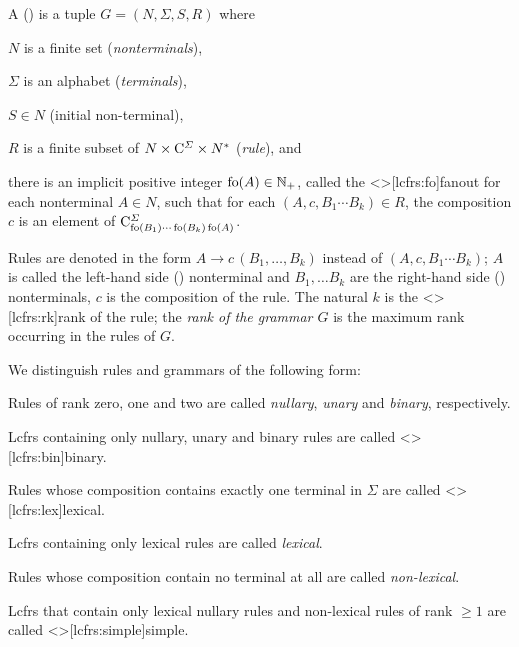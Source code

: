 \documentclass[../document.tex]{subfiles}
\begin{document}
    \begin{definition}
        A  ()%
        is a tuple \(G=(N, \varSigma, S, R)\) where
        \begin{compactenum}[(i)]
            \item \(N\) is a finite set (\emph{nonterminals}),
            \item \(\varSigma\) is an alphabet (\emph{terminals}),
            \item \(S \in N\) (initial non-terminal),
            \item \(R\) is a finite subset of \(N \times \mathrm{C}^\varSigma \times N^*\) (\emph{rule}), and
            \item there is an implicit positive integer \(\operatorname{fo}(A) \in \mathbb{N}_+\), called the <\lcfrs>[lcfrs:fo]{fanout} for each nonterminal \(A \in N\), such that
            for each \((A, c, B_1\cdots B_k) \in R\), the  composition \(c\) is an element of \(\mathrm{C}^\varSigma_{\operatorname{fo}(B_1) \cdots \operatorname{fo}(B_k) \operatorname{fo}(A)}\).
        \end{compactenum}

        Rules are denoted in the form \(A \to c\,(B_1, \ldots, B_k)\) instead of \((A, c, B_1 \cdots B_k)\); \(A\) is called the left-hand side () nonterminal and \(B_1, \ldots B_k\) are the right-hand side () nonterminals, \(c\) is the composition of the rule.
        The natural \(k\) is the <\lcfrs>[lcfrs:rk]{rank} of the rule; the \emph{rank of the grammar \(G\)} is the maximum rank occurring in the rules of \(G\).
    \end{definition}

    \begin{definition}
        We distinguish rules and grammars of the following form:
        \begin{compactitem}
            \item Rules of rank zero, one and two are called \emph{nullary}, \emph{unary} and \emph{binary}, respectively.
            \item Lcfrs containing only nullary, unary and binary rules are called <\lcfrs>[lcfrs:bin]{binary}.
            \item Rules whose composition contains exactly one terminal in \(\varSigma\) are called <\lcfrs>[lcfrs:lex]{lexical}.
            \item Lcfrs containing only lexical rules are called \emph{lexical}.
            \item Rules whose composition contain no terminal at all are called \emph{non-lexical}.
            \item Lcfrs that contain only lexical nullary rules and non-lexical rules of rank \(\ge 1\) are called <\lcfrs>[lcfrs:simple]{simple}.
        \end{compactitem}
    \end{definition}
\end{document}
